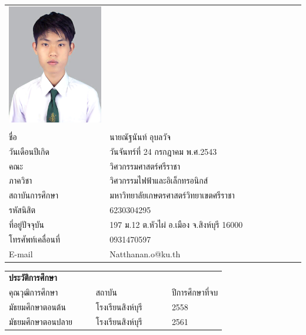\pagebreak
{}
\begin{center}
\begin{longtable}{@{}p{0.34\linewidth}@{}p{0.66\linewidth}@{}}
\includegraphics[scale=0.2,valign=c]{Chapters/img/nisit img/6230304287.jpg} & \\
    &\\
	ชื่อ							& นายณัฐนันท์ อุบลวัจ\\
	วันเดือนปีเกิด						& วันจันทร์ที่ 24 กรกฎาคม พ.ศ.2543\\
	คณะ							& วิศวกรรมศาสตร์ศรีราชา\\
	ภาควิชา							& วิศวกรรมไฟฟ้าและอิเล็กทรอนิกส์\\
	สถาบันการศึกษา						& มหาวิทยาลัยเกษตรศาสตร์วิทยาเขตศรีราชา\\
	รหัสนิสิต						& 6230304295\\
	ที่อยู่ปัจจุบัน						& 197 ม.12 ต.หัวไผ่ อ.เมือง จ.สิงห์บุรี 16000\\
	โทรศัพท์เคลื่อนที่					& 0931470597\\
	E-mail						& Natthanan.o@ku.th\\
\end{longtable}

\begin{longtable}{@{}p{0.4\linewidth}@{}p{0.35\linewidth}@{}p{0.25\linewidth}}
	\textbf{ประวัติการศึกษา} & &\\
	คุณวุฒิการศึกษา		&	สถาบัน				&	ปีการศึกษาที่จบ \\\hline
	มัธยมศึกษาตอนต้น	&	โรงเรียนสิงห์บุรี	&	2558 	\\
	มัธยมศึกษาตอนปลาย	&	โรงเรียนสิงห์บุรี	&	2561 	\\
\end{longtable}
\end{center}